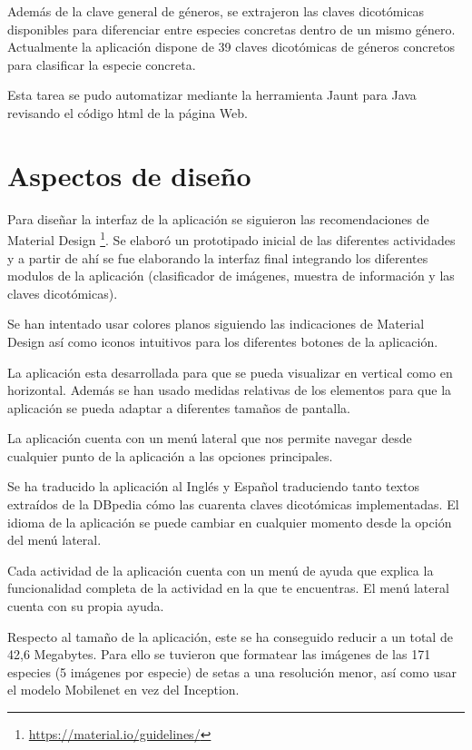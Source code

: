 Además de la clave general de géneros, se extrajeron las claves dicotómicas disponibles para diferenciar entre especies concretas dentro de un mismo género. Actualmente la aplicación dispone de 39 claves dicotómicas de géneros concretos para clasificar la especie concreta.

Esta tarea se pudo automatizar mediante la herramienta Jaunt para Java revisando el código html de la página Web.

\section{Aspectos de diseño}

Para diseñar la interfaz de la aplicación se siguieron las recomendaciones de Material Design \footnote{\url{https://material.io/guidelines/}}. Se elaboró un prototipado inicial de las diferentes actividades y a partir de ahí se fue elaborando la interfaz final integrando los diferentes modulos de la aplicación (clasificador de imágenes, muestra de información y las claves dicotómicas).

Se han intentado usar colores planos siguiendo las indicaciones de Material Design así como iconos intuitivos para los diferentes botones de la aplicación.

La aplicación esta desarrollada para que se pueda visualizar en vertical como en horizontal. Además se han usado medidas relativas de los elementos para que la aplicación se pueda adaptar a diferentes tamaños de pantalla.

La aplicación cuenta con un menú lateral que nos permite navegar desde cualquier punto de la aplicación a las opciones principales.

Se ha traducido la aplicación al Inglés y Español traduciendo tanto textos extraídos de la DBpedia cómo las cuarenta claves dicotómicas implementadas. El idioma de la aplicación se puede cambiar en cualquier momento desde la opción del menú lateral.

Cada actividad de la aplicación cuenta con un menú de ayuda que explica la funcionalidad completa de la actividad en la que te encuentras. El menú lateral cuenta con su propia ayuda.

Respecto al tamaño de la aplicación, este se ha conseguido reducir a un total de 42,6 Megabytes. Para ello se tuvieron que formatear las imágenes de las 171 especies (5 imágenes por especie) de setas a una resolución menor, así como usar el modelo Mobilenet en vez del Inception.









